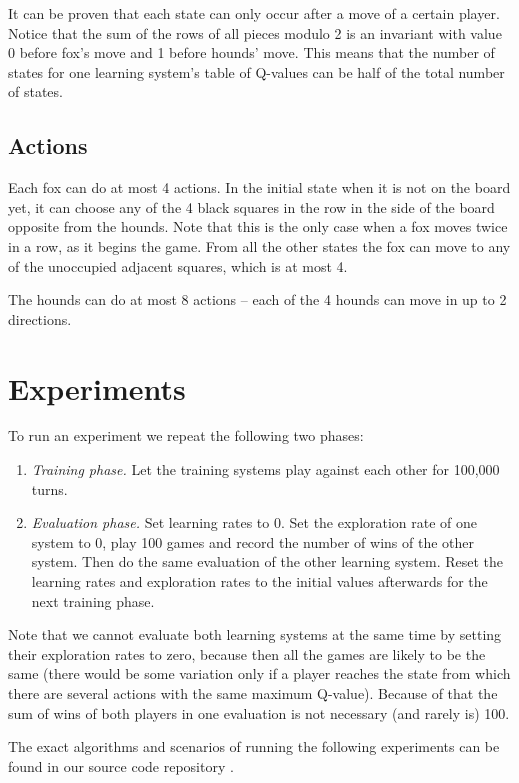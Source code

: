 \documentclass[a4paper]{article}
\begin{document}
It can be proven that each state can only occur after a move of a certain
player. Notice that the sum of the rows of all pieces modulo 2 is an invariant
with value 0 before fox's move and 1 before hounds' move. This means that the
number of states for one learning system's table of Q-values can be half of the
total number of states.

\subsection{Actions}
Each fox can do at most 4 actions. In the initial state when it is not on the
board yet, it can choose any of the 4 black squares in the row in the side of
the board opposite from the hounds. Note that this is the only case when a fox
moves twice in a row, as it begins the game. From all the other states the fox
can move to any of the unoccupied adjacent squares, which is at most 4.

The hounds can do at most 8 actions -- each of the 4 hounds can move in up to 2
directions.

\section{Experiments}
To run an experiment we repeat the following two phases:
\begin{enumerate}
    \item {\em Training phase.} Let the training systems play against each other for
        100,000 turns.
    \item {\em Evaluation phase.} Set learning rates to 0. Set the exploration
        rate of one system to 0, play 100 games and record the number of wins
        of the other system. Then do the same evaluation of the other learning
        system. Reset the learning rates and exploration rates to the initial
        values afterwards for the next training phase.
\end{enumerate}

Note that we cannot evaluate both learning systems at the same time by setting
their exploration rates to zero, because then all the games are likely to be
the same (there would be some variation only if a player reaches the state from
which there are several actions with the same maximum Q-value). Because of that
the sum of wins of both players in one evaluation is not necessary (and rarely
is) 100.

The exact algorithms and scenarios of running the following experiments can be
found in our source code repository \cite{github}.
\end{document}
